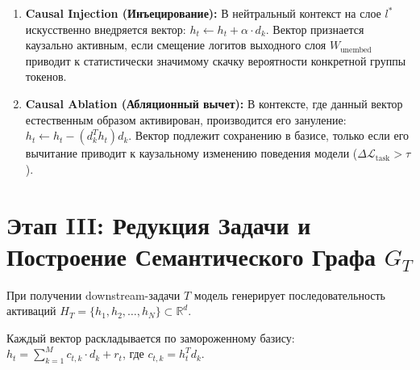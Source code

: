 \documentclass[11pt,a4paper]{article}
\begin{document}
\begin{center}
\end{center}

\begin{enumerate}
    \item \textbf{Causal Injection (Инъецирование):} В нейтральный контекст на слое $l^*$ искусственно внедряется вектор: $h_t \leftarrow h_t + \alpha \cdot d_k$. Вектор признается каузально активным, если смещение логитов выходного слоя $W_{\text{unembed}}$ приводит к статистически значимому скачку вероятности конкретной группы токенов.
    \item \textbf{Causal Ablation (Абляционный вычет):} В контексте, где данный вектор естественным образом активирован, производится его зануление: $h_t \leftarrow h_t - (d_k^T h_t)d_k$. Вектор подлежит сохранению в базисе, только если его вычитание приводит к каузальному изменению поведения модели ($\Delta \mathcal{L}_{\text{task}} > \tau$).
\end{enumerate}

\section{Этап III: Редукция Задачи и Построение Семантического Графа $G_T$}

При получении downstream-задачи $T$ модель генерирует последовательность активаций $H_T = \{h_1, h_2, \dots, h_N\} \subset \mathbb{R}^d$. 

Каждый вектор раскладывается по замороженному базису: $h_t = \sum_{k=1}^M c_{t,k} \cdot d_k + r_t$, где $c_{t,k} = h_t^T d_k$.
\end{document}
